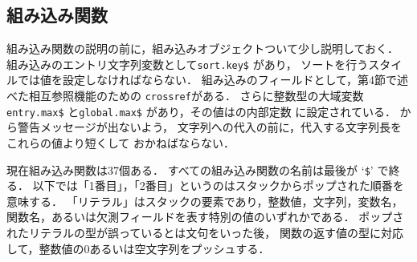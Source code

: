 \subsection{組み込み関数}
\label{built-in-fns}

組み込み関数の説明の前に，組み込みオブジェクトついて少し説明しておく．
組み込みのエントリ文字列変数として{\tt sort.key\$} があり，
ソートを行うスタイルでは値を設定しなければならない．
組み込みのフィールドとして，第4節で述べた相互参照機能のための
{\tt crossref}がある．
さらに整数型の大域変数
{\tt entry.max\$} と{\tt global.max\$} があり，その値は\BibTeX の内部定数
に設定されている．
\BibTeX から警告メッセージが出ないよう，
文字列への代入の前に，代入する文字列長をこれらの値より短くして
おかねばならない．

現在組み込み関数は37個ある．
すべての組み込み関数の名前は最後が `{\tt \$}' で終る．
以下では「1番目」，「2番目」というのはスタックからポップされた順番を意味する．
「リテラル」はスタックの要素であり，整数値，文字列，変数名，
関数名，あるいは欠測フィールドを表す特別の値のいずれかである．
ポップされたリテラルの型が誤っていると\BibTeX は文句をいった後，
関数の返す値の型に対応して，整数値の0あるいは空文字列をプッシュする．

